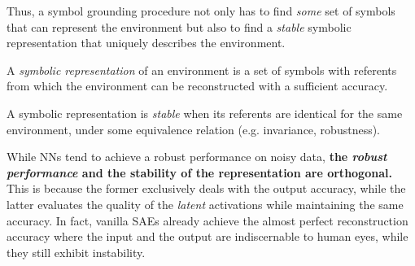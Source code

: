 Thus, a symbol grounding procedure not only has to find \emph{some} set of symbols that can represent the
environment but also to find a \emph{stable} symbolic representation that uniquely describes the environment.

\begin{defi}
A \emph{symbolic representation} of an environment is a set of symbols with referents
from which the environment can be reconstructed with a sufficient accuracy.
\end{defi}

\begin{defi}
A symbolic representation is \emph{stable} when its referents are identical
for the same environment, under some equivalence relation (e.g. invariance, robustness).
\end{defi}



While NNs tend to achieve a robust performance on noisy data,
\textbf{the \emph{robust performance} and the stability of the representation are orthogonal.}
This is because the former exclusively deals with the output accuracy,
while the latter evaluates the quality of the \emph{latent} activations while maintaining the same accuracy.
In fact, vanilla SAEs already achieve the almost perfect reconstruction accuracy
where the input and the output are indiscernable to human eyes,
while they still exhibit instability.


